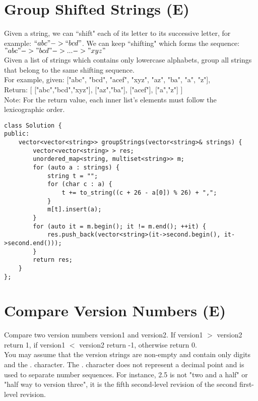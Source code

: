 \section{Group Shifted Strings (E)}
Given a string, we can ``shift" each of its letter to its successive letter, for example: $``abc" -> ``bcd"$. We can keep ``shifting" which forms the sequence: $"abc" -> "bcd" -> ... -> "xyz"$\\

Given a list of strings which contains only lowercase alphabets, group all strings that belong to the same shifting sequence.\\
For example, given: ["abc", "bcd", "acef", "xyz", "az", "ba", "a", "z"], \\
Return:
[
  ["abc","bcd","xyz"],
  ["az","ba"],
  ["acef"],
  ["a","z"]
] \\

Note: For the return value, each inner list's elements must follow the lexicographic order.\\

\begin{lstlisting}
class Solution {
public:
    vector<vector<string>> groupStrings(vector<string>& strings) {
        vector<vector<string> > res;
        unordered_map<string, multiset<string>> m;
        for (auto a : strings) {
            string t = "";
            for (char c : a) {
                t += to_string((c + 26 - a[0]) % 26) + ",";
            }
            m[t].insert(a);
        }
        for (auto it = m.begin(); it != m.end(); ++it) {
            res.push_back(vector<string>(it->second.begin(), it->second.end()));
        }
        return res;
    }
};
\end{lstlisting}


\section{Compare Version Numbers (E)}
Compare two version numbers version1 and version2. If version1 $>$ version2 return 1, if version1 $<$ version2 return -1, otherwise return 0.\\

You may assume that the version strings are non-empty and contain only digits and the . character.
The . character does not represent a decimal point and is used to separate number sequences.
For instance, 2.5 is not "two and a half" or "half way to version three", it is the fifth second-level revision of the second first-level revision.\\

